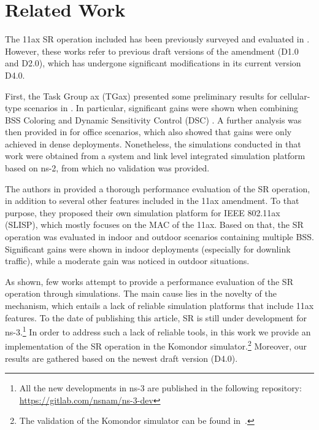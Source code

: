 \documentclass[conference]{IEEEtran}
\begin{document}
	\section{Related Work}
	\label{section:related_work}
	
	The 11ax SR operation included has been previously surveyed and evaluated in \cite{bellalta2016ieee,khorov2018tutorial,sr_evaluation_1,sr_evaluation_2}. However, these works refer to previous draft versions of the amendment (D1.0 and D2.0), which has undergone significant modifications in its current version D4.0.
	
	First, the Task Group ax (TGax) presented some preliminary results for cellular-type scenarios in \cite{sr_evaluation_1}. In particular, significant gains were shown when combining BSS Coloring and Dynamic Sensitivity Control (DSC) \cite{smith2017dynamic}. A further analysis was then provided in \cite{sr_evaluation_2} for office scenarios, which also showed that gains were only achieved in dense deployments. Nonetheless, the simulations conducted in that work were obtained from a system and link level integrated simulation platform based on ns-2, from which no validation was provided.
	
	The authors in \cite{sr_evaluation_3} provided a thorough performance evaluation of the SR operation, in addition to several other features included in the 11ax amendment. To that purpose, they proposed their own simulation platform for IEEE 802.11ax (SLISP), which mostly focuses on the MAC of the 11ax. Based on that, the SR operation was evaluated in indoor and outdoor scenarios containing multiple BSS. Significant gains were shown in indoor deployments (especially for downlink traffic), while a moderate gain was noticed in outdoor situations.
	
	As shown, few works attempt to provide a performance evaluation of the SR operation through simulations. The main cause lies in the novelty of the mechanism, which entails a lack of reliable simulation platforms that include 11ax features. To the date of publishing this article, SR is still under development for ns-3.\footnote{All the new developments in ns-3 are published in the following repository: \url{https://gitlab.com/nsnam/ns-3-dev}} In order to address such a lack of reliable tools, in this work we provide an implementation of the SR operation in the Komondor simulator.\footnote{The validation of the Komondor simulator can be found in~\cite{komondor}.} Moreover, our results are gathered based on the newest draft version (D4.0).
	
\end{document}
